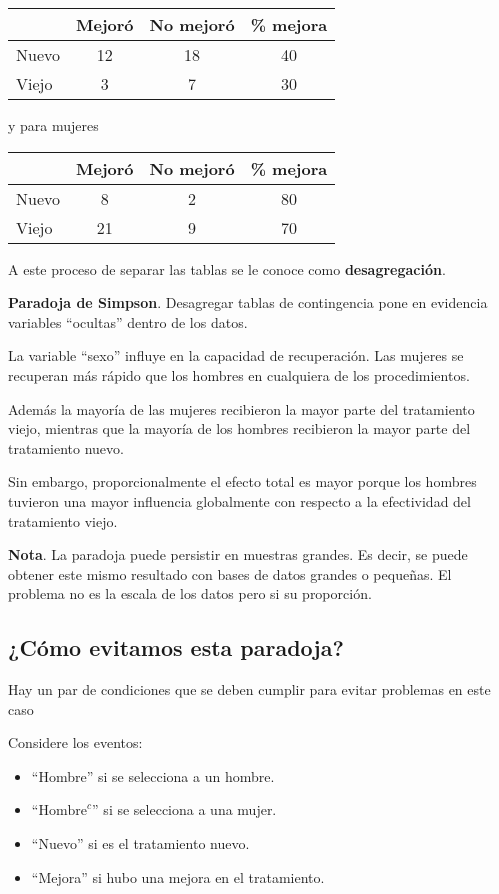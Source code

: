 \documentclass[
  12pt,
]{book}
\begin{document}
\begin{longtable}[]{@{}lccc@{}}
\toprule
& Mejoró & No mejoró & \% mejora\tabularnewline
\midrule
\endhead
Nuevo & 12 & 18 & 40\tabularnewline
Viejo & 3 & 7 & 30\tabularnewline
\bottomrule
\end{longtable}

y para mujeres

\begin{longtable}[]{@{}lccc@{}}
\toprule
& Mejoró & No mejoró & \% mejora\tabularnewline
\midrule
\endhead
Nuevo & 8 & 2 & 80\tabularnewline
Viejo & 21 & 9 & 70\tabularnewline
\bottomrule
\end{longtable}

A este proceso de separar las tablas se le conoce como \textbf{desagregación}.

\textbf{Paradoja de Simpson}. Desagregar tablas de contingencia pone en evidencia
variables ``ocultas'' dentro de los datos.

La variable ``sexo'' influye en la capacidad de recuperación. Las mujeres se
recuperan más rápido que los hombres en cualquiera de los procedimientos.

Además la mayoría de las mujeres recibieron la mayor parte del tratamiento
viejo, mientras que la mayoría de los hombres recibieron la mayor parte del
tratamiento nuevo.

Sin embargo, proporcionalmente el efecto total es mayor porque los hombres
tuvieron una mayor influencia globalmente con respecto a la efectividad del
tratamiento viejo.

\textbf{Nota}. La paradoja puede persistir en muestras grandes. Es decir, se puede
obtener este mismo resultado con bases de datos grandes o pequeñas. El problema
no es la escala de los datos pero si su proporción.

\hypertarget{cuxf3mo-evitamos-esta-paradoja}{%
\subsection{¿Cómo evitamos esta paradoja?}\label{cuxf3mo-evitamos-esta-paradoja}}

Hay un par de condiciones que se deben cumplir para evitar problemas en este caso

Considere los eventos:

\begin{itemize}
\item
  ``Hombre'' si se selecciona a un hombre.
\item
  ``\(\text{Hombre}^c\)'' si se selecciona a una mujer.
\item
  ``Nuevo'' si es el tratamiento nuevo.
\item
  ``Mejora'' si hubo una mejora en el tratamiento.
\end{itemize}
\end{document}
